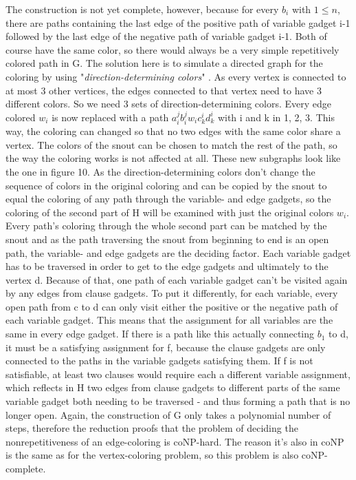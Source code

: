 \documentclass[12pt,a4paper]{article}
\begin{document}
\newline
The construction is not yet complete, however, because for every $b_i$ with $1 \leq n$, there are paths containing the last edge of the positive path of variable gadget i-1 followed by the last edge of the negative path of variable gadget i-1. Both of course have the same color, so there would always be a very simple repetitively colored path in G. The solution here is to simulate a directed graph for the coloring by using "\textit{direction-determining colors}" \citep[p. 6]{Manin2008}. As every vertex is connected to at most 3 other vertices, the edges connected to that vertex need to have 3 different colors. So we need 3 sets of direction-determining colors. Every edge colored $w_i$ is now replaced with a path $a^j_ib^j_iw_ic^i_kd^i_k$ with i and k in {1, 2, 3}. This way, the coloring can changed so that no two edges with the same color share a vertex. The colors of the snout can be chosen to match the rest of the path, so the way the coloring works is not affected at all. These new subgraphs look like the one in figure 10.
\newline
As the direction-determining colors don't change the sequence of colors in the original coloring and can be copied by the snout to equal the coloring of any path through the variable- and edge gadgets, so the coloring of the second part of H will be examined with just the original colors $w_i$. Every path's coloring through the whole second part can be matched by the snout and as the path traversing the snout from beginning to end is an open path, the variable- and edge gadgets are the deciding factor. Each variable gadget has to be traversed in order to get to the edge gadgets and ultimately to the vertex d. Because of that, one path of each variable gadget can't be visited again by any edges from clause gadgets. To put it differently, for each variable, every open path from c to d can only visit either the positive or the negative path of each variable gadget. This means that the assignment for all variables are the same in every edge gadget. If there is a path like this actually connecting $b_1$ to d, it must be a satisfying assignment for f, because the clause gadgets are only connected to the paths in the variable gadgets satisfying them. If f is not satisfiable, at least two clauses would require each a different variable assignment, which reflects in H two edges from clause gadgets to different parts of the same variable gadget both needing to be traversed - and thus forming a path that is no longer open. 
\newline
Again, the construction of G only takes a polynomial number of steps, therefore the reduction proofs that the problem of deciding the nonrepetitiveness of an edge-coloring is coNP-hard. The reason it's also in coNP is the same as for the vertex-coloring problem, so this problem is also coNP-complete.
\end{document}
